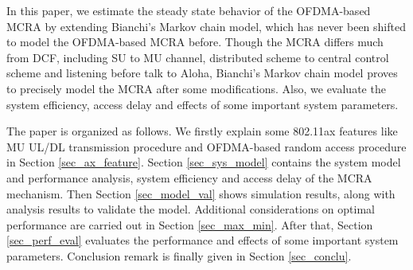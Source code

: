 \documentclass[journal]{IEEEtran}
\begin{document}
In this paper, we estimate the steady state behavior of the OFDMA-based MCRA by extending Bianchi's Markov chain model, which has never been shifted to model the OFDMA-based MCRA before. 
Though the MCRA differs much from DCF, including SU to MU channel, distributed scheme to central control scheme and listening before talk to Aloha, Bianchi's Markov chain model proves to precisely model the MCRA after some modifications.
Also, we evaluate the system efficiency, access delay and effects of some important system parameters. 

The paper is organized as follows.
We firstly explain some 802.11ax features like MU UL/DL transmission procedure and OFDMA-based random access procedure in Section \ref{sec_ax_feature}.
Section \ref{sec_sys_model} contains the system model and performance analysis, system efficiency and access delay of the MCRA mechanism. 
Then Section \ref{sec_model_val} shows simulation results, along with analysis results to validate the model.
Additional considerations on optimal performance are carried out in Section \ref{sec_max_min}. 
After that, Section \ref{sec_perf_eval} evaluates the performance and effects of some important system parameters. 
Conclusion remark is finally given in Section \ref{sec_conclu}.
\end{document}
